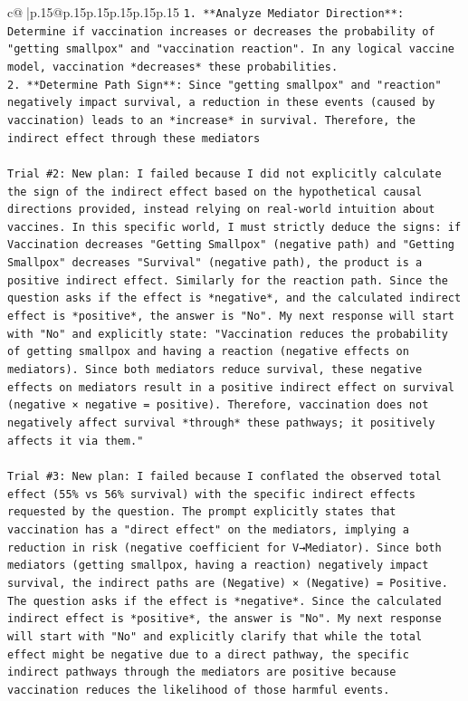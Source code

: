 \documentclass{article}
\begin{document}
{\begin{supertabular}{c@{$\;$}|p{.15\linewidth}@{}p{.15\linewidth}p{.15\linewidth}p{.15\linewidth}p{.15\linewidth}p{.15\linewidth}}
{{{\texttt{1.  **Analyze Mediator Direction**: Determine if vaccination increases or decreases the probability of "getting smallpox" and "vaccination reaction". In any logical vaccine model, vaccination *decreases* these probabilities.} \\
\texttt{2.  **Determine Path Sign**: Since "getting smallpox" and "reaction" negatively impact survival, a reduction in these events (caused by vaccination) leads to an *increase* in survival. Therefore, the indirect effect through these mediators} \\
\\ 
\texttt{Trial \#2: New plan: I failed because I did not explicitly calculate the sign of the indirect effect based on the hypothetical causal directions provided, instead relying on real{-}world intuition about vaccines. In this specific world, I must strictly deduce the signs: if Vaccination decreases "Getting Smallpox" (negative path) and "Getting Smallpox" decreases "Survival" (negative path), the product is a positive indirect effect. Similarly for the reaction path. Since the question asks if the effect is *negative*, and the calculated indirect effect is *positive*, the answer is "No". My next response will start with "No" and explicitly state: "Vaccination reduces the probability of getting smallpox and having a reaction (negative effects on mediators). Since both mediators reduce survival, these negative effects on mediators result in a positive indirect effect on survival (negative × negative = positive). Therefore, vaccination does not negatively affect survival *through* these pathways; it positively affects it via them."} \\
\\ 
\texttt{Trial \#3: New plan: I failed because I conflated the observed total effect (55\% vs 56\% survival) with the specific indirect effects requested by the question. The prompt explicitly states that vaccination has a "direct effect" on the mediators, implying a reduction in risk (negative coefficient for V→Mediator). Since both mediators (getting smallpox, having a reaction) negatively impact survival, the indirect paths are (Negative) × (Negative) = Positive. The question asks if the effect is *negative*. Since the calculated indirect effect is *positive*, the answer is "No". My next response will start with "No" and explicitly clarify that while the total effect might be negative due to a direct pathway, the specific indirect pathways through the mediators are positive because vaccination reduces the likelihood of those harmful events.} \\
}}}
\end{supertabular}}
\end{document}
